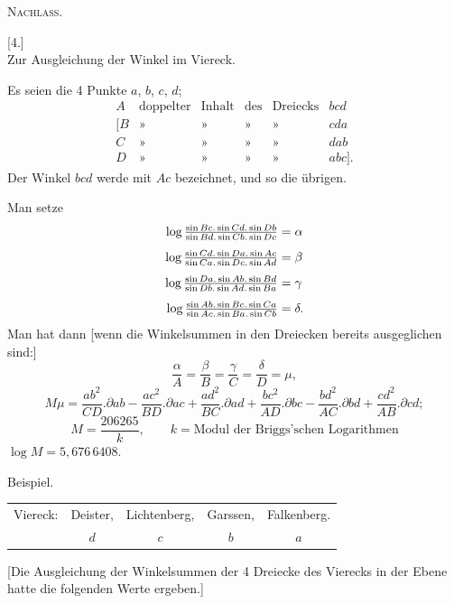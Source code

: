 \clearpage
{}\hfill\textsc{Nachlass.}\hfill\mbox{}\par\medskip
\begin{center}[4.]\\[5pt]Zur Ausgleichung der Winkel im Viereck.\end{center}
Es seien die 4 Punkte $a$, $b$, $c$, $d$;
\[
\begin{array}{rlllll}
A&\text{doppelter}&\text{Inhalt}&\text{des}&\text{Dreiecks}&bcd\\
{[}B&\text{»}&\text{»}&\text{»}&\text{»}&cda\\
C&\text{»}&\text{»}&\text{»}&\text{»}&dab\\
D&\text{»}&\text{»}&\text{»}&\text{»}&abc].
\end{array}
\]
Der Winkel $bcd$ werde mit $Ac$ bezeichnet, und so die übrigen.

Man setze
\[
\begin{aligned}
\log\tfrac{\sin Bc.\sin Cd.\sin Db}{\sin Bd.\sin Cb.\sin Dc}&=\alpha\\[4pt]
\log\tfrac{\sin Cd.\sin Da.\sin Ac}{\sin Ca.\sin Dc.\sin Ad}&=\beta\\[4pt]
\log\tfrac{\sin Da.\sin Ab.\sin Bd}{\sin Db.\sin Ad.\sin Ba}&=\gamma\\[4pt]
\llap{\raisebox{-.5ex}{\text{\tiny.}}\hspace{3.5cm}}\log\tfrac{\sin Ab.\sin Bc.\sin Ca}{\sin Ac.\sin Ba.\sin Cb}&=\delta.
\end{aligned}
\]
Man hat dann [wenn die Winkelsummen in den Dreiecken bereits ausgeglichen sind:]
\[
\frac\alpha A=\frac\beta B=\frac\gamma C=\frac\delta D=\mu,
\]
\[
M\mu=\frac{ab^2}{CD}.\partial ab-\frac{ac^2}{BD}.\partial ac+\frac{ad^2}{BC}.\partial ad+\frac{bc^2}{AD}.\partial bc-\frac{bd^2}{AC}.\partial bd+\frac{cd^2}{AB}.\partial cd;
\]
\[
M=\frac{206265}{k},\qquad k=\text{Modul der Briggs'schen Logarithmen}
\]
\noindent\hspace*{.7cm}$\log M=5{,}676\,6408$.
\begin{center}Beispiel.\end{center}
\begin{center}
\begin{tabular}{rcccc}
Viereck:&Deister,&Lichtenberg,&Garssen,&Falkenberg.\\
&$d$&$c$&$b$&$a$
\end{tabular}
\end{center}
[Die Ausgleichung der Winkelsummen der 4 Dreiecke des Vierecks in der Ebene hatte die folgenden Werte ergeben.]


